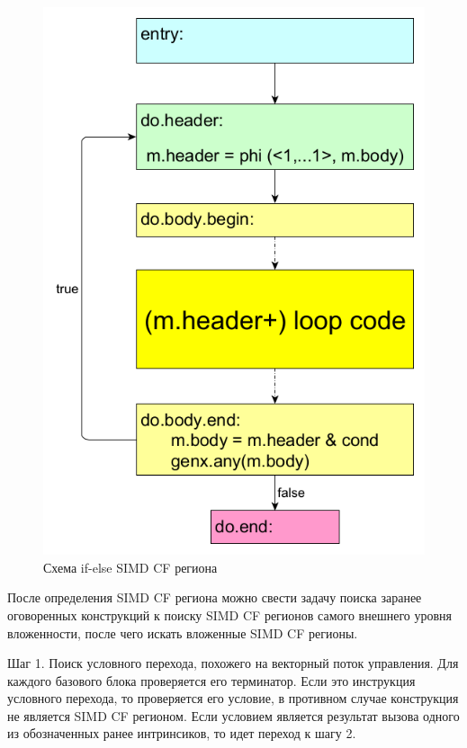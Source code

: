\begin{figure}
  \centering
  \includegraphics[scale=0.27]{Images/do-while-FE-generalized-colored.png}
  \caption{Схема if-else SIMD CF региона}
  \label{fig:generalized-loop-simdcf}
\end{figure}

После определения SIMD CF региона можно свести задачу поиска заранее оговоренных
конструкций к поиску SIMD CF регионов самого внешнего уровня вложенности, после
чего искать вложенные SIMD CF регионы.

Шаг 1. Поиск условного перехода, похожего на векторный поток управления. Для
каждого базового блока проверяется его терминатор. Если это инструкция условного
перехода, то проверяется его условие, в противном случае конструкция не является
SIMD CF регионом. Если условием является результат вызова одного из обозначенных
ранее интринсиков, то идет переход к шагу 2.

